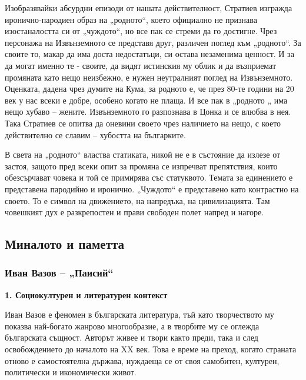 \documentclass[12pt,a4paper]{article}
\begin{document}
\indent Изобразявайки абсурдни епизоди от нашата действителност, Стратиев изгражда иронично-пародиен образ на „родното“, което официално не признава изостаналостта си от „чуждото“, но все пак се стреми да го достигне. Чрез персонажа на Извънземното се представя друг, различен поглед към „родното“. За своите то, макар да има доста недостатъци, си остава незаменима ценност. И за да могат именно те - своите, да видят истинския му облик и да възприемат промяната като нещо неизбежно, е нужен неутралният поглед на Извънземното. Оценката, дадена чрез думите на Кума, за родното е, че през 80-те години на 20 век у нас всеки е добре, особено когато не плаща. И все пак в „родното „ има нещо хубаво – жените. Извънземното го разпознава в Цонка и се влюбва в нея. Така Стратиев се опитва да оневини своето чрез наличието на нещо, с което действително се славим – хубостта на българките.
\vspace{0.1cm}
 
\indent В света на „родното“ властва статиката, никой не е в състояние да излезе от застоя, защото пред всеки опит за промяна се изпречват препятствия, които обезсърчават човека и той се примирява със статуквото. Темата за единението е представена пародийно и иронично. „Чуждото“ е представено като контрастно на своето. То е символ на движението, на напредъка, на цивилизацията. Там човешкият дух е разкрепостен и прави свободен полет напред и нагоре.
\newpage


\subsection{Миналото и паметта}
\subsubsection{\colorbox{green!40}{Иван Вазов – „Паисий“}}
\textbf{1. Социокултурен и литературен контекст}
\vspace{0.1cm}
 
\indent Иван Вазов е феномен в българската литература, тъй като творчеството му показва най-богато жанрово многообразие, а в творбите му се оглежда българската същност. Авторът живее и твори както преди, така и след освобождението до началото на XX век. Това е време на преход, когато страната отново е самостоятелна държава, нуждаеща се от своя самобитен, културен, политически и икономически живот.
\vspace{0.1cm}
 
\end{document}
